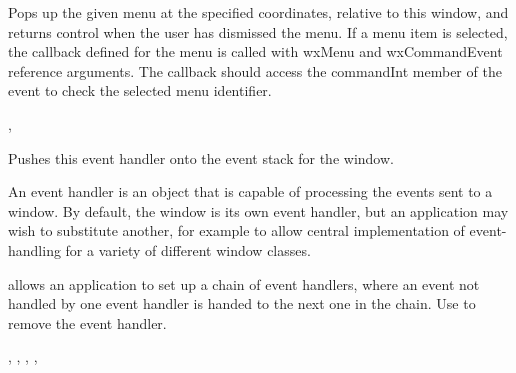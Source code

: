 \label{wxwindowpopupmenu}


Pops up the given menu at the specified coordinates, relative to this
window, and returns control when the user has dismissed the menu. If a
menu item is selected, the callback defined for the menu is called with
wxMenu and wxCommandEvent reference arguments. The callback should access
the commandInt member of the event to check the selected menu identifier.






, 

\label{wxwindowpusheventhandler}


Pushes this event handler onto the event stack for the window.




An event handler is an object that is capable of processing the events
sent to a window. By default, the window is its own event handler, but
an application may wish to substitute another, for example to allow
central implementation of event-handling for a variety of different
window classes.

 allows
an application to set up a chain of event handlers, where an event not handled by one event handler is
handed to the next one in the chain. Use  to
remove the event handler.


,\rtfsp
{},\rtfsp
{},\rtfsp
{},\rtfsp
{}

